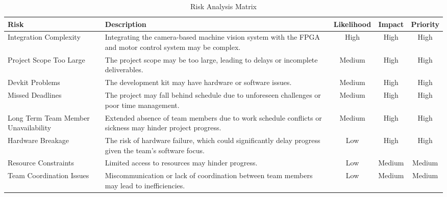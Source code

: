 \documentclass{article}
\begin{document}
\begin{table}[H]
\centering
\caption{Risk Analysis Matrix}
\label{tab:risk_matrix}
\begin{tabularx}{\textwidth}{|p{}|X|c|c|c|}
    \hline
    \textbf{Risk} & \textbf{Description} & \textbf{Likelihood} & \textbf{Impact} & \textbf{Priority} \\
    \hline
    Integration Complexity & Integrating the camera-based machine vision system with the FPGA and motor control system may be complex. & High & High & High \\
    \hline
    Project Scope Too Large & The project scope may be too large, leading to delays or incomplete deliverables. & Medium & High & High \\
    \hline
    Devkit Problems & The development kit may have hardware or software issues. & Medium & High & High \\
    \hline
    Missed Deadlines & The project may fall behind schedule due to unforeseen challenges or poor time management. & Medium & High & High \\
    \hline
    Long Term Team Member Unavailability & Extended absence of team members due to work schedule conflicts or sickness may hinder project progress. & Medium & High & High \\
    \hline
    Hardware Breakage & The risk of hardware failure, which could significantly delay progress given the team’s software focus. & Low & High & High \\
    \hline
    Resource Constraints & Limited access to resources may hinder progress. & Low & Medium & Medium \\
    \hline
    Team Coordination Issues & Miscommunication or lack of coordination between team members may lead to inefficiencies. & Low & Medium & Medium \\
    \hline
\end{tabularx}
\end{table}
\end{document}
